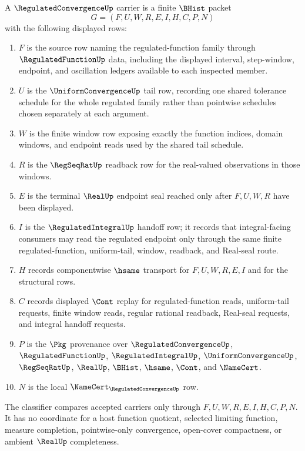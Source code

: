 \begin{definition}
\label{def:regulated-convergence-carrier}
A $\RegulatedConvergenceUp$ carrier is a finite $\BHist$ packet
$$
G=(F,U,W,R,E,I,H,C,P,N)
$$
with the following displayed rows:
\begin{enumerate}
\item $F$ is the source row naming the regulated-function family through $\RegulatedFunctionUp$ data, including the displayed interval, step-window, endpoint, and oscillation ledgers available to each inspected member.
\item $U$ is the $\UniformConvergenceUp$ tail row, recording one shared tolerance schedule for the whole regulated family rather than pointwise schedules chosen separately at each argument.
\item $W$ is the finite window row exposing exactly the function indices, domain windows, and endpoint reads used by the shared tail schedule.
\item $R$ is the $\RegSeqRatUp$ readback row for the real-valued observations in those windows.
\item $E$ is the terminal $\RealUp$ endpoint seal reached only after $F,U,W,R$ have been displayed.
\item $I$ is the $\RegulatedIntegralUp$ handoff row; it records that integral-facing consumers may read the regulated endpoint only through the same finite regulated-function, uniform-tail, window, readback, and Real-seal route.
\item $H$ records componentwise $\hsame$ transport for $F,U,W,R,E,I$ and for the structural rows.
\item $C$ records displayed $\Cont$ replay for regulated-function reads, uniform-tail requests, finite window reads, regular rational readback, Real-seal requests, and integral handoff requests.
\item $P$ is the $\Pkg$ provenance over $\RegulatedConvergenceUp$, $\RegulatedFunctionUp$, $\RegulatedIntegralUp$, $\UniformConvergenceUp$, $\RegSeqRatUp$, $\RealUp$, $\BHist$, $\hsame$, $\Cont$, and $\NameCert$.
\item $N$ is the local $\NameCert_{\RegulatedConvergenceUp}$ row.
\end{enumerate}
The classifier compares accepted carriers only through $F,U,W,R,E,I,H,C,P,N$. It has no coordinate for a host function quotient, selected limiting function, measure completion, pointwise-only convergence, open-cover compactness, or ambient $\RealUp$ completeness.
\end{definition}

